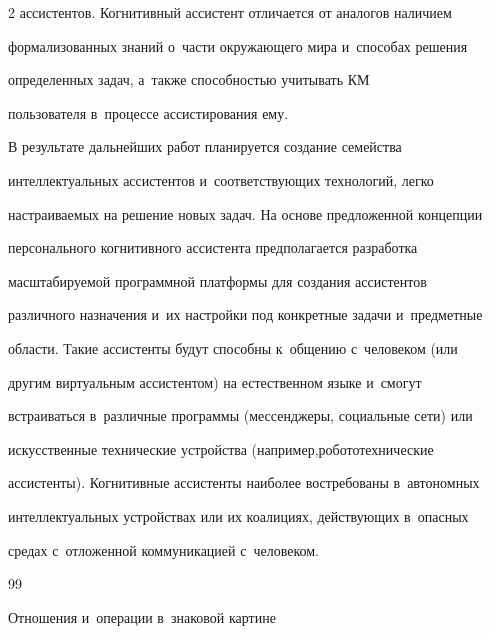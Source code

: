 \begin{multicols}{2}
ассистентов. Когнитивный ассистент отличается от аналогов наличием 


формализованных знаний о~час\-ти окру\-жа\-юще\-го мира и~способах решения 


определенных задач, а~также способностью учитывать КМ


пользователя в~процессе ассистирования ему. 


  


  В результате дальнейших работ планируется создание семейства 


интеллектуальных ассистентов и~соответствующих технологий, легко 


настраиваемых на решение новых задач. На основе предложенной концепции 


персонального когнитивного ас\-сис\-тен\-та предполагается разработка 


масштабируемой программной платформы для создания ас\-сис\-тен\-тов 


различного назначения и~их настройки под конкретные задачи и~предметные 


области. Такие ас\-сис\-тен\-ты будут способны к~общению с~человеком (или 


другим виртуальным ас\-сис\-тен\-том) на естественном языке и~смогут 


встраиваться в~различные программы (мессенджеры, социальные сети) или 


искусственные технические устройства (например,\linebreak робототехнические 


ас\-сис\-тен\-ты). Когнитивные ас\-сис\-тен\-ты наиболее востребованы в~автономных 


интел\-лек\-ту\-аль\-ных устройствах или их коалициях, действующих в~опасных 


средах с~отложенной коммуникацией с~человеком.


  


 {\small\frenchspacing


 {%




 \begin{thebibliography}{99}


 




   Отношения и~операции в~знаковой картине 



\end{thebibliography}}}
\end{multicols}
